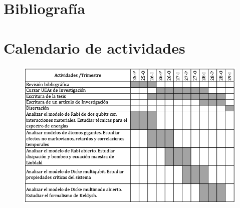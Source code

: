 \documentclass[onecolumn,notitlepage,letterpaper,aps,pra,12pt]{article}
\numberwithin{equation}{section}
\begin{document}
\section{Bibliografía}

\printbibliography[heading=none]


\section{Calendario de actividades}

\begin{figure}[H]
    \centering
    \includegraphics[width=1\linewidth]{Images/Calendario.png}
    \label{Calendario}
\end{figure}
\end{document}
